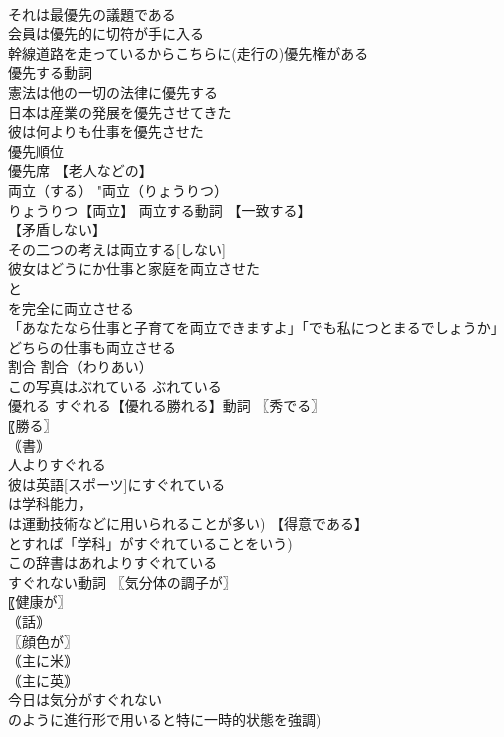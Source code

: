 \documentclass[8pt]{extreport}
\begin{document}
\begin{CJK}{UTF8}{min}
\\	それは最優先の議題である 
\\	会員は優先的に切符が手に入る 
\\	幹線道路を走っているからこちらに(走行の)優先権がある 
\\	優先する動詞 
\\	憲法は他の一切の法律に優先する 
\\	日本は産業の発展を優先させてきた 
\\	彼は何よりも仕事を優先させた 
\\	優先順位 
\\	優先席 【老人などの】
\\	両立（する）		"両立（りょうりつ） 
\\	りょうりつ【両立】 両立する動詞 【一致する】
\\	【矛盾しない】
\\	その二つの考えは両立する[しない] 
\\	彼女はどうにか仕事と家庭を両立させた 
\\	と
\\	を完全に両立させる 
\\	「あなたなら仕事と子育てを両立できますよ」「でも私につとまるでしょうか」 
\\	どちらの仕事も両立させる 
\\	割合		割合（わりあい） 
\\	この写真はぶれている		ぶれている
\\	優れる		すぐれる【優れる勝れる】動詞 〖秀でる〗
\\	〖勝る〗
\\	｟書｠ 
\\	人よりすぐれる 
\\	彼は英語[スポーツ]にすぐれている 
\\	は学科能力， 
\\	は運動技術などに用いられることが多い) 【得意である】
\\	とすれば「学科」がすぐれていることをいう) 
\\	この辞書はあれよりすぐれている 
\\	すぐれない動詞 〖気分体の調子が〗
\\	〖健康が〗
\\	｟話｠ 
\\	〖顔色が〗
\\	｟主に米｠ 
\\	｟主に英｠ 
\\	今日は気分がすぐれない 
\\	のように進行形で用いると特に一時的状態を強調) 

\end{CJK}
\end{document}
